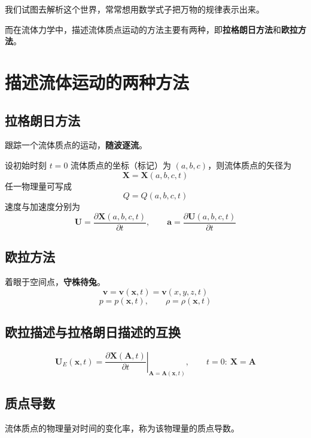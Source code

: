 
我们试图去解析这个世界，常常想用数学式子把万物的规律表示出来。

而在流体力学中，描述流体质点运动的方法主要有两种，即\textbf{拉格朗日方法}和\textbf{欧拉方法}。

\section{描述流体运动的两种方法}

\subsection{拉格朗日方法}

跟踪一个流体质点的运动，\textbf{随波逐流}。

设初始时刻 $t=0$ 流体质点的坐标（标记）为 $(a,b,c)$，则流体质点的矢径为
\[
\boldsymbol{X}=\boldsymbol{X}(a,b,c,t)
\]
任一物理量可写成
\[
Q=Q(a,b,c,t)
\]
速度与加速度分别为
\[
\boldsymbol{U}=\frac{\partial\boldsymbol{X}(a,b,c,t)}{\partial t},\qquad
\boldsymbol{a}=\frac{\partial\boldsymbol{U}(a,b,c,t)}{\partial t}
\]

\subsection{欧拉方法}

着眼于空间点，\textbf{守株待兔}。
\[
\boldsymbol{v}=\boldsymbol{v}(\boldsymbol{x},t)=\boldsymbol{v}(x,y,z,t)
\]
\[
p=p(\boldsymbol{x},t),\qquad\rho=\rho(\boldsymbol{x},t)
\]

\subsection{欧拉描述与拉格朗日描述的互换}
\[
\boldsymbol{U}_{E}(\boldsymbol{x},t)
=\left.\frac{\partial\boldsymbol{X}(\boldsymbol{A},t)}{\partial t}\right|_{\boldsymbol{A}=\boldsymbol{A}(\boldsymbol{x},t)},
\qquad
t=0:\ \boldsymbol{X}=\boldsymbol{A}
\]

\subsection{质点导数}

\begin{definition}[质点导数]
	流体质点的物理量对时间的变化率，称为该物理量的质点导数。
\end{definition}

